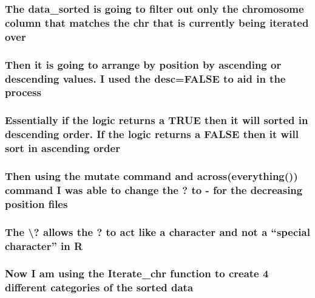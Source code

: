 \documentclass[
]{article}
\begin{document}
\subsubsection{The data\_sorted is going to filter out only the
chromosome column that matches the chr that is currently being iterated
over}\label{the-data_sorted-is-going-to-filter-out-only-the-chromosome-column-that-matches-the-chr-that-is-currently-being-iterated-over}

\subsubsection{Then it is going to arrange by position by ascending or
descending values. I used the desc=FALSE to aid in the
process}\label{then-it-is-going-to-arrange-by-position-by-ascending-or-descending-values.-i-used-the-descfalse-to-aid-in-the-process}

\subsubsection{Essentially if the logic returns a TRUE then it will
sorted in descending order. If the logic returns a FALSE then it will
sort in ascending
order}\label{essentially-if-the-logic-returns-a-true-then-it-will-sorted-in-descending-order.-if-the-logic-returns-a-false-then-it-will-sort-in-ascending-order}

\subsubsection{Then using the mutate command and across(everything())
command I was able to change the ? to - for the decreasing position
files}\label{then-using-the-mutate-command-and-acrosseverything-command-i-was-able-to-change-the-to---for-the-decreasing-position-files}

\subsubsection{The \textbackslash? allows the ? to act like a character
and not a ``special character'' in
R}\label{the-allows-the-to-act-like-a-character-and-not-a-special-character-in-r}

\subsubsection{Now I am using the Iterate\_chr function to create 4
different categories of the sorted
data}\label{now-i-am-using-the-iterate_chr-function-to-create-4-different-categories-of-the-sorted-data}
\end{document}
